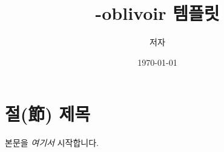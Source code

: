 \documentclass[ %
    a4paper,    %
    amsmath,    %
    itemph,     %
]{oblivoir}     %
\begin{document}
\title{\koTeX-oblivoir 템플릿}
\author{저자}
\date{\today}

\maketitle

\section{절(節) 제목}


본문을 \emph{여기서} 시작합니다.
\end{document}
